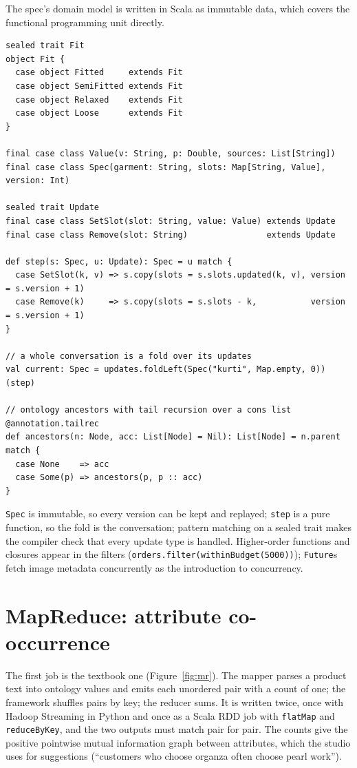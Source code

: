 The spec's domain model is written in Scala as immutable data, which covers the functional programming unit directly.

\begin{lstlisting}
sealed trait Fit
object Fit {
  case object Fitted     extends Fit
  case object SemiFitted extends Fit
  case object Relaxed    extends Fit
  case object Loose      extends Fit
}

final case class Value(v: String, p: Double, sources: List[String])
final case class Spec(garment: String, slots: Map[String, Value], version: Int)

sealed trait Update
final case class SetSlot(slot: String, value: Value) extends Update
final case class Remove(slot: String)                extends Update

def step(s: Spec, u: Update): Spec = u match {
  case SetSlot(k, v) => s.copy(slots = s.slots.updated(k, v), version = s.version + 1)
  case Remove(k)     => s.copy(slots = s.slots - k,           version = s.version + 1)
}

// a whole conversation is a fold over its updates
val current: Spec = updates.foldLeft(Spec("kurti", Map.empty, 0))(step)

// ontology ancestors with tail recursion over a cons list
@annotation.tailrec
def ancestors(n: Node, acc: List[Node] = Nil): List[Node] = n.parent match {
  case None    => acc
  case Some(p) => ancestors(p, p :: acc)
}
\end{lstlisting}

\texttt{Spec} is immutable, so every version can be kept and replayed; \texttt{step} is a pure function, so the fold is the conversation; pattern matching on a sealed trait makes the compiler check that every update type is handled. Higher-order functions and closures appear in the filters (\texttt{orders.filter(withinBudget(5000))}); \texttt{Future}s fetch image metadata concurrently as the introduction to concurrency.

\section{MapReduce: attribute co-occurrence}

The first job is the textbook one (Figure~\ref{fig:mr}). The mapper parses a product text into ontology values and emits each unordered pair with a count of one; the framework shuffles pairs by key; the reducer sums. It is written twice, once with Hadoop Streaming in Python and once as a Scala RDD job with \texttt{flatMap} and \texttt{reduceByKey}, and the two outputs must match pair for pair. The counts give the positive pointwise mutual information graph between attributes, which the studio uses for suggestions (``customers who choose organza often choose pearl work'').

